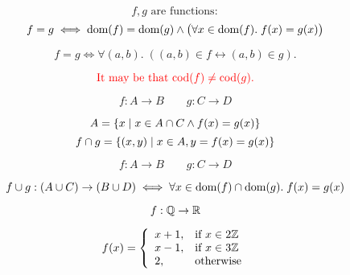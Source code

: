 
\begin{frame}{}
  \begin{center}
  \end{center}
\end{frame}

\begin{frame}{}
  \begin{theorem}
    \[
      f, g \text{ are functions}:
    \]
    \[
      f = g \iff \text{dom}(f) = \text{dom}(g)
        \land \big(\forall x \in \text{dom}(f).\; f(x) = g(x) \big)
    \]
  \end{theorem}

  \pause
  \[
    f = g \iff \forall (a, b).\; ((a, b) \in f \leftrightarrow (a, b) \in g).
  \]

  \pause
  \[
    \textcolor{red}{\text{It may be that } \text{cod}(f) \neq \text{cod}(g).}
  \]
\end{frame}

\begin{frame}{}
  \[
    f: A \to B \qquad g: C \to D
  \]

  \begin{center}
  \end{center}

  \pause
  \begin{theorem}
    \[
      A = \{x \mid x \in A \cap C \land f(x) = g(x)\}
    \]
    \[
      f \cap g = \{(x, y) \mid x \in A, y = f(x) = g(x)\}
    \]
  \end{theorem}
\end{frame}

\begin{frame}{}
  \[
    f: A \to B \qquad g: C \to D
  \]

  \begin{center}
  \end{center}

  \pause
  \begin{theorem}
    {\[
      f \cup g: (A \cup C) \to (B \cup D) \iff
      \forall x \in \text{dom}(f) \cap \text{dom}(g).\; f(x) = g(x)
    \]}
  \end{theorem}

  \pause
  \begin{exampleblock}{}
    \[
      f: \mathbb{Q} \to \mathbb{R}
    \]

    \[
      f(x) = \left\{\begin{array}{ll}
        x + 1, & \text{if } x \in 2\mathbb{Z}{} \\
        x - 1, & \text{if } x \in 3\mathbb{Z}{} \\
        2,     & \text{otherwise}
      \end{array}\right.
    \]
  \end{exampleblock}
\end{frame}

